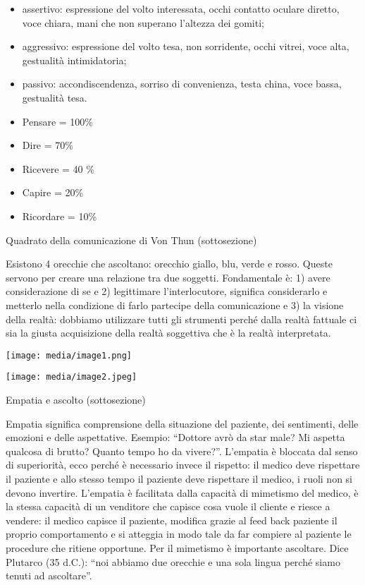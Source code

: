 \documentclass[]{article}
\begin{document}
\begin{itemize}
\item
  assertivo: espressione del volto interessata, occhi contatto oculare
  diretto, voce chiara, mani che non superano l'altezza dei gomiti;
\item
  aggressivo: espressione del volto tesa, non sorridente, occhi vitrei,
  voce alta, gestualità intimidatoria;
\item
  passivo: accondiscendenza, sorriso di convenienza, testa china, voce
  bassa, gestualità tesa.
\item
  Pensare = 100\%
\end{itemize}

\begin{itemize}
\item
  Dire = 70\%
\item
  Ricevere = 40 \%
\item
  Capire = 20\%
\item
  Ricordare = 10\%
\end{itemize}

Quadrato della comunicazione di Von Thun (sottosezione)

Esistono 4 orecchie che ascoltano: orecchio giallo, blu, verde e rosso.
Queste servono per creare una relazione tra due soggetti. Fondamentale
è: 1) avere considerazione di se e 2) legittimare l'interlocutore,
significa considerarlo e metterlo nella condizione di farlo partecipe
della comunicazione e 3) la visione della realtà: dobbiamo utilizzare
tutti gli strumenti perché dalla realtà fattuale ci sia la giusta
acquisizione della realtà soggettiva che è la realtà interpretata.

\texttt{[image: media/image1.png]}

\texttt{[image: media/image2.jpeg]}

Empatia e ascolto (sottosezione)

Empatia significa comprensione della situazione del paziente, dei
sentimenti, delle emozioni e delle aspettative. Esempio: ``Dottore avrò
da star male? Mi aspetta qualcosa di brutto? Quanto tempo ho da
vivere?''. L'empatia è bloccata dal senso di superiorità, ecco perché è
necessario invece il rispetto: il medico deve rispettare il paziente e
allo stesso tempo il paziente deve rispettare il medico, i ruoli non si
devono invertire. L'empatia è facilitata dalla capacità di mimetismo del
medico, è la stessa capacità di un venditore che capisce cosa vuole il
cliente e riesce a vendere: il medico capisce il paziente, modifica
grazie al feed back paziente il proprio comportamento e si atteggia in
modo tale da far compiere al paziente le procedure che ritiene
opportune. Per il mimetismo è importante ascoltare. Dice Plutarco (35
d.C.): ``noi abbiamo due orecchie e una sola lingua perché siamo tenuti
ad ascoltare''.
\end{document}
